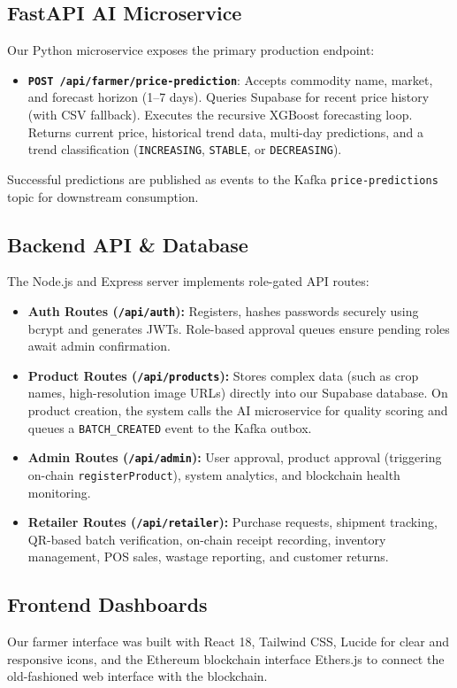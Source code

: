 \documentclass[conference]{IEEEtran}
\begin{document}
\subsection{FastAPI AI Microservice}
Our Python microservice exposes the primary production endpoint:
\begin{itemize}
    \item \textbf{\texttt{POST /api/farmer/price-prediction}}: Accepts commodity name, market, and forecast horizon (1--7 days). Queries Supabase for recent price history (with CSV fallback). Executes the recursive XGBoost forecasting loop. Returns current price, historical trend data, multi-day predictions, and a trend classification (\texttt{INCREASING}, \texttt{STABLE}, or \texttt{DECREASING}).
\end{itemize}
Successful predictions are published as events to the Kafka \texttt{price-predictions} topic for downstream consumption.

\subsection{Backend API \& Database}
The Node.js and Express server implements role-gated API routes:
\begin{itemize}
    \item \textbf{Auth Routes (\texttt{/api/auth}):} Registers, hashes passwords securely using bcrypt and generates JWTs. Role-based approval queues ensure pending roles await admin confirmation.
    \item \textbf{Product Routes (\texttt{/api/products}):} Stores complex data (such as crop names, high-resolution image URLs) directly into our Supabase database. On product creation, the system calls the AI microservice for quality scoring and queues a \texttt{BATCH\_CREATED} event to the Kafka outbox.
    \item \textbf{Admin Routes (\texttt{/api/admin}):} User approval, product approval (triggering on-chain \texttt{registerProduct}), system analytics, and blockchain health monitoring.
    \item \textbf{Retailer Routes (\texttt{/api/retailer}):} Purchase requests, shipment tracking, QR-based batch verification, on-chain receipt recording, inventory management, POS sales, wastage reporting, and customer returns.
\end{itemize}

\subsection{Frontend Dashboards}
Our farmer interface was built with React 18, Tailwind CSS, Lucide for clear and responsive icons, and the Ethereum blockchain interface Ethers.js to connect the old-fashioned web interface with the blockchain.
\end{document}
